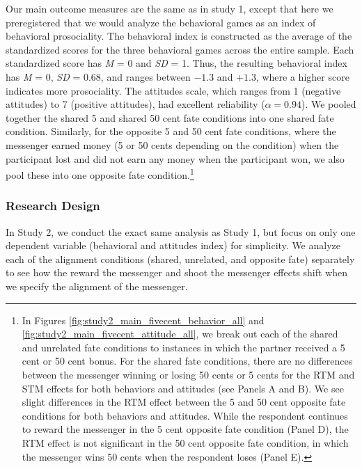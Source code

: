 Our main outcome measures are the same as in study 1, except that here
we preregistered that we would analyze the behavioral games as an index
of behavioral prosociality. The behavioral index is constructed as the
average of the standardized scores for the three behavioral games across
the entire sample. Each standardized score has \emph{M} = 0 and
\emph{SD} = 1. Thus, the resulting behavioral index has \emph{M} = 0,
\emph{SD} = 0.68, and ranges between $-1.3$ and $+1.3$, where a higher score
indicates more prosociality. The attitudes scale, which ranges from 1
(negative attitudes) to 7 (positive attitudes), had excellent
reliability ($\alpha = 0.94$). We pooled together the shared 5 and shared
50 cent fate conditions into one shared fate condition. 
Similarly, for the opposite 5 and 50 cent fate conditions, 
where the messenger earned money (5 or 50 cents
depending on the condition) when the participant lost and did not earn
any money when the participant won, we also pool these into one opposite fate 
condition.\footnote{In Figures
\ref{fig:study2_main_fivecent_behavior_all} and \ref{fig:study2_main_fivecent_attitude_all}, 
we break out each of the shared and
unrelated fate conditions to instances in which the partner received a 5 cent or
50 cent bonus. For the shared fate conditions, there are no differences between
the messenger winning or losing 50 cents or 5 cents for the RTM and STM effects
for both behaviors and attitudes (see Panels A and B). We see slight differences in the 
RTM effect between the 5 and 50 cent opposite fate conditions for both behaviors and attitudes. 
While the respondent continues to reward the messenger in the 5 cent opposite fate condition (Panel D), 
the RTM effect is not significant in the 50 cent opposite fate condition, in which
 the messenger wins 50 cents when the respondent
loses (Panel E).}

\subsubsection{Research Design}
In Study 2, we conduct the exact same analysis as Study 1, but focus on only one
dependent variable (behavioral and attitudes index) for simplicity. We
analyze each of the alignment conditions (shared, unrelated, and
opposite fate) separately to see how the reward the messenger and shoot
the messenger effects shift when we specify the alignment of the
messenger.